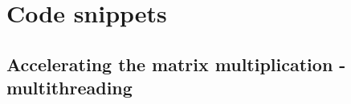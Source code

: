 
\newpage
\section{Code snippets}
\label{sec:acc-code}

	\subsection{Accelerating the matrix multiplication - multithreading}
	\label{ssec:acc-mt}
